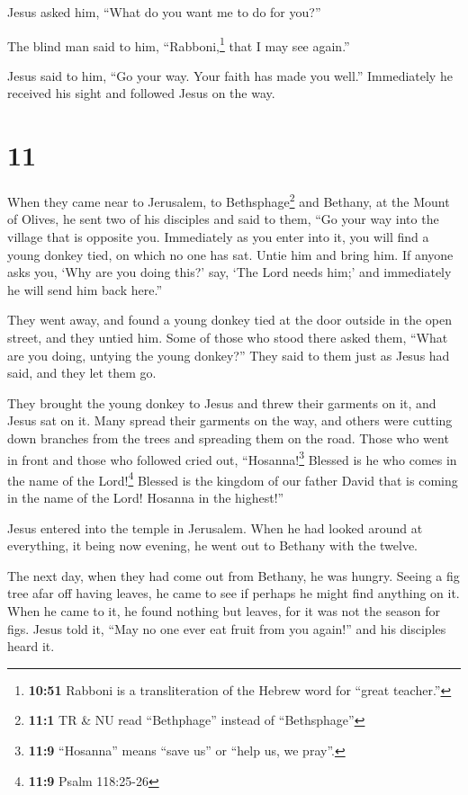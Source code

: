  Jesus asked him, ``What do you want me to do for you?''

The blind man said to him, ``Rabboni,\footnote{\textbf{10:51} Rabboni is
  a transliteration of the Hebrew word for ``great teacher.''} that I
may see again.''

 Jesus said to him, ``Go your way. Your faith has made
you well.'' Immediately he received his sight and followed Jesus on the
way.

\hypertarget{section-10}{%
\section{11}\label{section-10}}

 When they came near to Jerusalem, to
Bethsphage\footnote{\textbf{11:1} TR \& NU read ``Bethphage'' instead of
  ``Bethsphage''} and Bethany, at the Mount of Olives, he sent two of
his disciples  and said to them, ``Go your way into the
village that is opposite you. Immediately as you enter into it, you will
find a young donkey tied, on which no one has sat. Untie him and bring
him.  If anyone asks you, `Why are you doing this?' say,
`The Lord needs him;' and immediately he will send him back here.''

 They went away, and found a young donkey tied at the door
outside in the open street, and they untied him.  Some of
those who stood there asked them, ``What are you doing, untying the
young donkey?''  They said to them just as Jesus had said,
and they let them go.

 They brought the young donkey to Jesus and threw their
garments on it, and Jesus sat on it.  Many spread their
garments on the way, and others were cutting down branches from the
trees and spreading them on the road.  Those who went in
front and those who followed cried out, ``Hosanna!\footnote{\textbf{11:9}
  ``Hosanna'' means ``save us'' or ``help us, we pray''.} Blessed is he
who comes in the name of the Lord!\footnote{\textbf{11:9} Psalm
  118:25-26}  Blessed is the kingdom of our father David
that is coming in the name of the Lord! Hosanna in the highest!''

 Jesus entered into the temple in Jerusalem. When he had
looked around at everything, it being now evening, he went out to
Bethany with the twelve.

 The next day, when they had come out from Bethany, he
was hungry.  Seeing a fig tree afar off having leaves, he
came to see if perhaps he might find anything on it. When he came to it,
he found nothing but leaves, for it was not the season for figs.
 Jesus told it, ``May no one ever eat fruit from you
again!'' and his disciples heard it.

